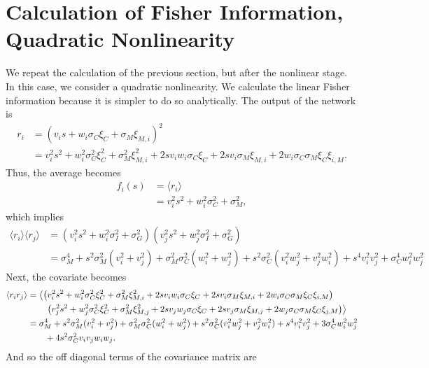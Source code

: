 \documentclass[11pt]{article}
\begin{document}
	\section{Calculation of Fisher Information, Quadratic Nonlinearity}\label{app:fisher-quadratic}
	We repeat the calculation of the previous section, but after the nonlinear stage. In this case, we consider a quadratic nonlinearity. We calculate the linear Fisher information because it is simpler to do so analytically. The output of the network is 
	\begin{align}
	r_i &= (v_i s + w_i \sigma_C \xi_C + \sigma_M \xi_{M,i})^2 \\
	&= v_i^2 s^2 + w_i^2 \sigma_C^2 \xi_C^2 +  \sigma_M^2 \xi_{M,i}^2 + 2s v_i w_i \sigma_C \xi_C + 2 sv_i  \sigma_M \xi_{M,i} + 2w_i \sigma_C \sigma_M \xi_{C} \xi_{i,M}.
	\end{align}
	Thus, the average becomes 
	\begin{align}
	f_i(s) &= \langle r_i \rangle \\
	&= v_i^2 s^2 + w_i^2 \sigma_C^2 + \sigma_M^2,
	\end{align}
	which implies 
	\begin{align}
	\langle r_i \rangle  \langle r_j \rangle &= (v_i^2 s^2 + w_i^2 \sigma_I^2 + \sigma_G^2)(v_j^2 s^2 + w_j^2 \sigma_I^2 + \sigma_G^2)\\
	&= \sigma_M^4 + s^2 \sigma_M^2 (v_i^2 + v_j^2)  + \sigma_M^2 \sigma_C^2 (w_i^2 + w_j^2) + s^2 \sigma_C^2 (v_i^2 w_j^2 + v_j^2 w_i^2) + s^4 v_i^2 v_j^2+ \sigma_C^4 w_i^2 w_j^2
	\end{align}
	Next, the covariate becomes 
	\begin{align}
	\langle r_i r_j \rangle &= \left\langle \left(v_i^2 s^2 + w_i^2 \sigma_C^2 \xi_C^2 +  \sigma_M^2 \xi_{M,i}^2 + 2s v_i w_i \sigma_C \xi_C + 2 sv_i  \sigma_M \xi_{M,i} + 2w_i \sigma_C \sigma_M \xi_{C} \xi_{i,M}\right) \right. \notag \\
	& \qquad \left. \left(v_j^2 s^2 + w_j^2 \sigma_C^2 \xi_C^2 +  \sigma_M^2 \xi_{M,j}^2 + 2s v_j w_j \sigma_C \xi_C + 2 sv_j  \sigma_M \xi_{M,j} + 2w_j \sigma_C \sigma_M \xi_{C} \xi_{j,M}\right)\right\rangle \\
	&= \sigma_M^4 + s^2 \sigma_M^2 (v_i^2 + v_j^2) + \sigma_M^2 \sigma_C^2 (w_i^2 + w_j^2) + s^2 \sigma_C^2 (v_i^2 w_j^2 + v_j^2 w_i^2) + s^4 v_i^2 v_j^2 + 3\sigma_C^4 w_i^2 w_j^2 \notag \\
	& \qquad + 4s^2 \sigma_C^2 v_i v_j w_i w_j.
	\end{align}
	And so the off diagonal terms of the covariance matrix are 
\end{document}
